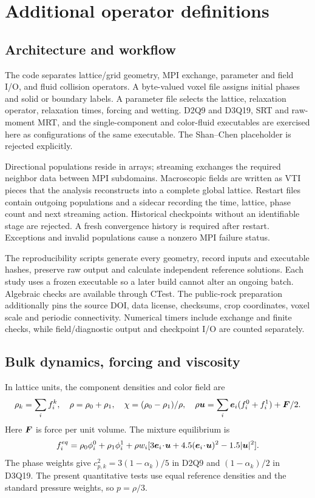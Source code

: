 \section{Additional operator definitions}
\subsection{Architecture and workflow}
The code separates lattice/grid geometry, MPI exchange, parameter and field
I/O, and fluid collision operators. A byte-valued voxel file assigns initial
phases and solid or boundary labels. A parameter file selects the lattice,
relaxation operator, relaxation times, forcing and wetting. D2Q9 and D3Q19,
SRT and raw-moment MRT, and the single-component and color-fluid executables
are exercised here as configurations of the same executable. The Shan--Chen
placeholder is rejected explicitly.

Directional populations reside in arrays; streaming exchanges the required
neighbor data between MPI subdomains. Macroscopic fields are written as VTI
pieces that the analysis reconstructs into a complete global lattice.
Restart files contain outgoing populations and a sidecar recording the time,
lattice, phase count and next streaming action. Historical checkpoints
without an identifiable stage are rejected. A fresh convergence history is
required after restart. Exceptions and invalid populations cause a nonzero
MPI failure status.

The reproducibility scripts generate every geometry, record inputs and
executable hashes, preserve raw output and calculate independent reference
solutions. Each study uses a frozen executable so a later build cannot alter
an ongoing batch. Algebraic checks are available through CTest.
The public-rock preparation additionally pins the source DOI, data license,
checksums, crop coordinates, voxel scale and periodic connectivity. Numerical
timers include exchange and finite checks, while field/diagnostic output and
checkpoint I/O are counted separately.

\subsection{Bulk dynamics, forcing and viscosity}
In lattice units, the component densities and color field are
\begin{equation}
 \rho_k=\sum_i f_i^k,\quad \rho=\rho_0+\rho_1,\quad
 \chi=(\rho_0-\rho_1)/\rho,\quad
 \rho\bm{u}=\sum_i\bm{e}_i(f_i^0+f_i^1)+\bm{F}/2.
\end{equation}
Here $\bm{F}$ is force per unit volume. The mixture equilibrium is
\begin{equation}
 f_i^{eq}=\rho_0\phi_i^0+\rho_1\phi_i^1+
 \rho w_i[3\bm{e}_i\!\cdot\!\bm{u}+
 4.5(\bm{e}_i\!\cdot\!\bm{u})^2-1.5|\bm{u}|^2].
\end{equation}
The phase weights give $c_{p,k}^2=3(1-\alpha_k)/5$ in D2Q9 and
$(1-\alpha_k)/2$ in D3Q19. The present quantitative tests use equal reference
densities and the standard pressure weights, so $p=\rho/3$.

